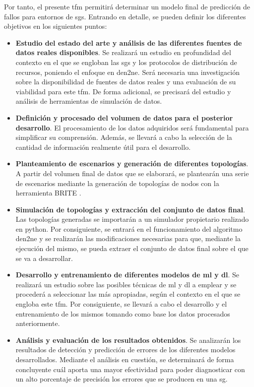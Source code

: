 \vspace{3mm}

\pagebreak

Por tanto, el presente \gls{tfm} permitirá determinar un modelo final de predicción de fallos para entornos de \gls{sg}s. Entrando en detalle, se pueden definir los diferentes objetivos en los siguientes puntos:

\begin{itemize}
    \item \textbf{Estudio del estado del arte y análisis de las diferentes fuentes de datos reales disponibles}. Se realizará un estudio en profundidad del contexto en el que se engloban las \gls{sg}s y los protocolos de distribución de recursos, poniendo el enfoque en \gls{den2ne}. Será necesaria una investigación sobre la disponibilidad de fuentes de datos reales y una evaluación de su viabilidad para este \gls{tfm}. De forma adicional, se precisará del estudio y análisis de herramientas de simulación de datos.
    
    \item \textbf{Definición y procesado del volumen de datos para el posterior desarrollo}. El procesamiento de los datos adquiridos será fundamental para simplificar su comprensión. Además, se llevará a cabo la selección de la cantidad de información realmente útil para el desarrollo.    

    \item \textbf{Planteamiento de escenarios y generación de diferentes topologías}. A partir del volumen final de datos que se elaborará, se plantearán una serie de escenarios mediante la generación de topologías de nodos con la herramienta BRITE \cite{brite}.
    
    \item \textbf{Simulación de topologías y extracción del conjunto de datos final}. Las topologías generadas se importarán a un simulador propietario realizado en python. Por consiguiente, se entrará en el funcionamiento del algoritmo \gls{den2ne} y se realizarán las modificaciones necesarias para que, mediante la ejecución del mismo, se pueda extraer el conjunto de datos final sobre el que se va a desarrollar.
    
    \item \textbf{Desarrollo y entrenamiento de diferentes modelos de \gls{ml} y \gls{dl}}. Se realizará un estudio sobre las posibles técnicas de \gls{ml} y \gls{dl} a emplear y se procederá a seleccionar las más apropiadas, según el contexto en el que se engloba este \gls{tfm}. Por consiguiente, se llevará a cabo el desarrollo y el entrenamiento de los mismos tomando como base los datos procesados anteriormente. 
    
    \item \textbf{Análisis y evaluación de los resultados obtenidos}. Se analizarán los resultados de detección y predicción de errores de los diferentes modelos desarrollados. Mediante el análisis en cuestión, se determinará de forma concluyente cuál aporta una mayor efectividad para poder diagnosticar con un alto porcentaje de precisión los errores que se producen en una \gls{sg}.
    
\end{itemize}

